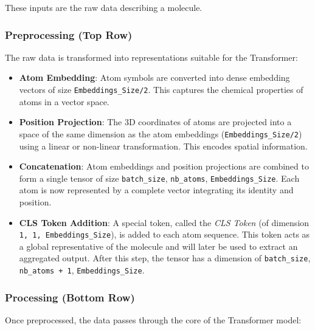 \documentclass{article}
\begin{document}
These inputs are the raw data describing a molecule.

\subsubsection{Preprocessing (Top Row)}
The raw data is transformed into representations suitable for the Transformer:

\begin{itemize}
    \item \textbf{Atom Embedding}: Atom symbols are converted into dense embedding vectors of size \texttt{Embeddings\_Size/2}. This captures the chemical properties of atoms in a vector space.
    \item \textbf{Position Projection}: The 3D coordinates of atoms are projected into a space of the same dimension as the atom embeddings (\texttt{Embeddings\_Size/2}) using a linear or non-linear transformation. This encodes spatial information.
    \item \textbf{Concatenation}: Atom embeddings and position projections are combined to form a single tensor of size \texttt{batch\_size}, \texttt{nb\_atoms}, \texttt{Embeddings\_Size}. Each atom is now represented by a complete vector integrating its identity and position.
    \item \textbf{CLS Token Addition}: A special token, called the \textit{CLS Token} (of dimension \texttt{1, 1, Embeddings\_Size}), is added to each atom sequence. This token acts as a global representative of the molecule and will later be used to extract an aggregated output. After this step, the tensor has a dimension of \texttt{batch\_size}, \texttt{nb\_atoms + 1}, \texttt{Embeddings\_Size}.
\end{itemize}

\subsubsection{Processing (Bottom Row)}
Once preprocessed, the data passes through the core of the Transformer model:
\end{document}
